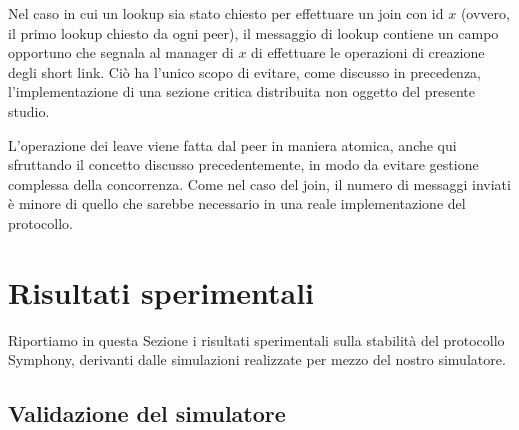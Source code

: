 \documentclass[prodmode,acmtap]{acmlarge}
\begin{document}

Nel caso in cui un lookup sia stato chiesto per effettuare un join con id $x$ (ovvero, il primo lookup chiesto da ogni peer), il messaggio di lookup contiene un campo opportuno che segnala al manager di $x$ di effettuare le operazioni di creazione degli short link. Ciò ha l'unico scopo di evitare, come discusso in precedenza, l'implementazione di una sezione critica distribuita non oggetto del presente studio.

L'operazione dei leave  viene fatta dal peer in maniera atomica, anche qui sfruttando il concetto discusso precedentemente, in modo da evitare gestione complessa della concorrenza. Come nel caso del join, il numero di messaggi inviati è minore di quello che sarebbe necessario in una reale implementazione del protocollo.









\section{Risultati sperimentali} \label{risultati}
Riportiamo in questa Sezione i risultati sperimentali sulla stabilità del protocollo Symphony, derivanti dalle simulazioni realizzate per mezzo del nostro simulatore.

\subsection{Validazione del simulatore}
\end{document}

